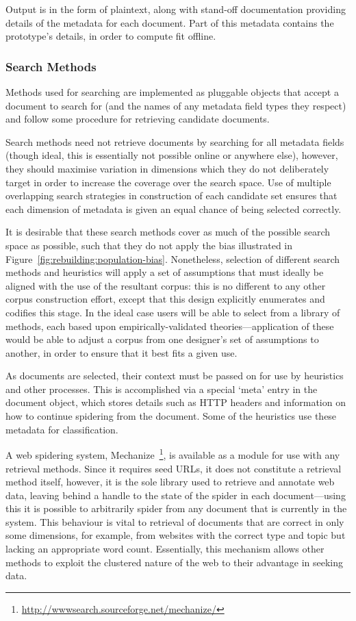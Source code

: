 Output is in the form of plaintext, along with stand-off documentation providing details of the metadata for each document.  Part of this metadata contains the prototype's details, in order to compute fit offline.



\subsubsection{Search Methods}
Methods used for searching are implemented as pluggable objects that accept a document to search for (and the names of any metadata field types they respect) and follow some procedure for retrieving candidate documents.

Search methods need not retrieve documents by searching for all metadata fields (though ideal, this is essentially not possible online or anywhere else), however, they should maximise variation in dimensions which they do not deliberately target in order to increase the coverage over the search space.  Use of multiple overlapping search strategies in construction of each candidate set ensures that each dimension of metadata is given an equal chance of being selected correctly.

It is desirable that these search methods cover as much of the possible search space as possible, such that they do not apply the bias illustrated in Figure~\ref{fig:rebuilding:population-bias}.  Nonetheless, selection of different search methods and heuristics will apply a set of assumptions that must ideally be aligned with the use of the resultant corpus: this is no different to any other corpus construction effort, except that this design explicitly enumerates and codifies this stage.  In the ideal case users will be able to select from a library of methods, each based upon empirically-validated theories---application of these would be able to adjust a corpus from one designer's set of assumptions to another, in order to ensure that it best fits a given use.

As documents are selected, their context must be passed on for use by heuristics and other processes.  This is accomplished via a special `meta' entry in the document object, which stores details such as HTTP headers and information on how to continue spidering from the document.  Some of the heuristics use these metadata for classification.

A web spidering system, Mechanize~\footnote{\url{http://wwwsearch.sourceforge.net/mechanize/}}, is available as a module for use with any retrieval methods.  Since it requires seed URLs, it does not constitute a retrieval method itself, however, it is the sole library used to retrieve and annotate web data, leaving behind a handle to the state of the spider in each document---using this it is possible to arbitrarily spider from any document that is currently in the system.  This behaviour is vital to retrieval of documents that are correct in only some dimensions, for example, from websites with the correct type and topic but lacking an appropriate word count.  Essentially, this mechanism allows other methods to exploit the clustered nature of the web to their advantage in seeking data.


